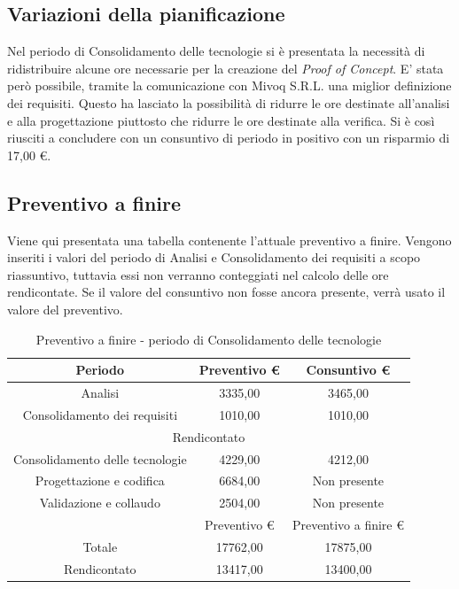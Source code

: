\documentclass[./PianodiProgetto.tex]{subfiles}
\begin{document}
\subsection{Variazioni della pianificazione}
Nel periodo di Consolidamento delle tecnologie si è presentata la necessità di ridistribuire alcune ore necessarie per la creazione del \textit{Proof of Concept}. E' stata però possibile, tramite la comunicazione con Mivoq S.R.L. una miglior definizione dei requisiti. Questo ha lasciato la possibilità di ridurre le ore destinate all'analisi e alla progettazione piuttosto che ridurre le ore destinate alla verifica. Si è così riusciti a concludere con un consuntivo di periodo in positivo con un risparmio di 17,00 \euro{}.

\subsection{Preventivo a finire}
Viene qui presentata una tabella contenente l'attuale preventivo a finire.
Vengono inseriti i valori del periodo di Analisi e Consolidamento dei requisiti a scopo riassuntivo, tuttavia essi non verranno conteggiati nel calcolo delle ore rendicontate. Se il valore del consuntivo non fosse ancora presente, verrà usato il valore del preventivo.

\begin{table}[H]
	\centering
	\begin{tabular}{|c|c|c|}
		\hline
		Periodo&Preventivo \euro{}&Consuntivo \euro{} \\ \hline
		Analisi&3335,00&3465,00  \\ \hline
		Consolidamento dei requisiti&1010,00&1010,00  \\ \hline
		\multicolumn{3}{|c|}{Rendicontato}  \\ \hline
		Consolidamento delle tecnologie&4229,00&4212,00  \\ \hline
		Progettazione e codifica&6684,00&Non presente  \\ \hline
		Validazione e collaudo&2504,00&Non presente  \\ \hline
		 &Preventivo \euro{}&Preventivo a finire \euro{}  \\ \hline
		Totale&17762,00&17875,00 \\ \hline
		Rendicontato&13417,00&13400,00 \\ \hline
	\end{tabular}
	\caption{Preventivo a finire - periodo di Consolidamento delle tecnologie}
\end{table}
\end{document}
